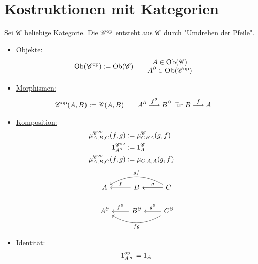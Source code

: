 
\chapter{Kostruktionen mit Kategorien}

\begin{definition}\enter
	Sei $\mathscr C$ beliebige Kategorie.
	Die  $\mathscr C^{\text{op}}$ entsteht aus $\mathscr C$ durch "Umdrehen der Pfeile".
	\begin{itemize}
		\item \ul{Objekte:}
			\begin{align*}
				\operatorname{Ob}(\mathscr C^{\text{op}})&:=\operatorname{Ob}(\mathscr C)\qquad\begin{matrix}
						A\in\operatorname{Ob}(\mathscr C)\\
						A^\partial\in\operatorname{Ob}(\mathscr C^{\text{op}})
						\end{matrix}
			\end{align*}
		\item \ul{Morphismen:}
			\begin{align*}
				\mathscr C^{\text{op}}(A,B)&:=\mathscr C(A,B)\qquad
						A^\partial\overset{f^\partial}{\longrightarrow}B^\partial\text{ für }B\overset{f}{\longrightarrow}A
			\end{align*}
		\item \ul{Komposition:}
			\begin{align*}
				\mu_{A,B,C}^{\mathscr C^{\text{op}}}(f,g)&:=\mu_{CBA}^\mathscr C(g,f)\qquad\\
				1_{A^\partial}^{\mathscr C^{\text{op}}}&:=1_A^\mathscr C\\
				\mu_{A,B,C}^{\mathscr C^{\text{op}}}(f,g) &:= \mu_{C,A,A}(g,f)\\
			\end{align*}
		\begin{align*}
				\begin{tikzcd}[ampersand replacement=\&]
					A \& B \arrow[l, "f"'] \& C \arrow[l, "g"'] \arrow[l] \arrow[l] \arrow[ll, "gf"', bend right]\\
					A^{\partial} \& B^{\partial} \arrow[l, "f^{\partial}"'] \& C^{\partial} \arrow[l, "g^{\partial}"'] \arrow[ll, "fg", bend left]
				\end{tikzcd}
			\end{align*}
		\item \ul{Identität:}
			\begin{align*}
				1_{A^{\text{op}}}^{\text{op}} = 1_A
			\end{align*}
	\end{itemize}
\end{definition}

